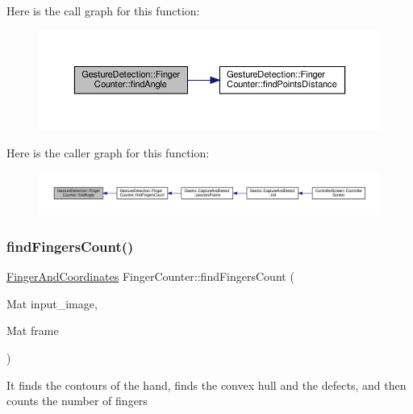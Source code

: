 Here is the call graph for this function\+:
\nopagebreak
\begin{figure}[H]
\begin{center}
\leavevmode
\includegraphics[width=350pt]{class_gesture_detection_1_1_finger_counter_aebba4b98a6332a74ba996536ca080dbb_cgraph}
\end{center}
\end{figure}
Here is the caller graph for this function\+:
\nopagebreak
\begin{figure}[H]
\begin{center}
\leavevmode
\includegraphics[width=350pt]{class_gesture_detection_1_1_finger_counter_aebba4b98a6332a74ba996536ca080dbb_icgraph}
\end{center}
\end{figure}
\mbox{\label{class_gesture_detection_1_1_finger_counter_a611201352a86dd943f866c1be9507081}} 
\subsubsection{\texorpdfstring{find\+Fingers\+Count()}{findFingersCount()}}
{\footnotesize\ttfamily \hyperlink{class_gesture_detection_1_1_finger_and_coordinates}{Finger\+And\+Coordinates} Finger\+Counter\+::find\+Fingers\+Count (\begin{DoxyParamCaption}\item[{Mat}]{input\+\_\+image,  }\item[{Mat}]{frame }\end{DoxyParamCaption})}

It finds the contours of the hand, finds the convex hull and the defects, and then counts the number of fingers


